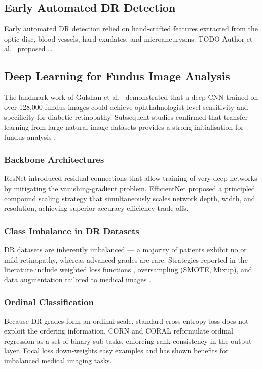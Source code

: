 \documentclass[12pt, a4paper]{article}
\begin{document}
\subsection{Early Automated DR Detection}
\label{ssec:lit_early}

Early automated DR detection relied on hand-crafted features extracted from the
optic disc, blood vessels, hard exudates, and microaneurysms.
TODO Author et al.\ \cite{TODO_early1} proposed \ldots

\subsection{Deep Learning for Fundus Image Analysis}
\label{ssec:lit_dl}

The landmark work of Gulshan et al.\ \cite{TODO_gulshan2016} demonstrated that a
deep CNN trained on over 128,000 fundus images could achieve ophthalmologist-level
sensitivity and specificity for diabetic retinopathy.
Subsequent studies confirmed that transfer learning from large natural-image
datasets provides a strong initialisation for fundus analysis
\cite{TODO_transfer_learning}.

\subsubsection{Backbone Architectures}
ResNet \cite{TODO_he2016} introduced residual connections that allow training of
very deep networks by mitigating the vanishing-gradient problem.
EfficientNet \cite{TODO_tan2019} proposed a principled compound scaling strategy
that simultaneously scales network depth, width, and resolution, achieving
superior accuracy-efficiency trade-offs.

\subsubsection{Class Imbalance in DR Datasets}
DR datasets are inherently imbalanced --- a majority of patients exhibit no or mild
retinopathy, whereas advanced grades are rare.
Strategies reported in the literature include weighted loss functions
\cite{TODO_weighted_loss}, oversampling (SMOTE, Mixup), and data augmentation
tailored to medical images \cite{TODO_augmentation}.

\subsubsection{Ordinal Classification}
Because DR grades form an ordinal scale, standard cross-entropy loss does not
exploit the ordering information.
CORN \cite{TODO_corn} and CORAL \cite{TODO_coral} reformulate ordinal regression
as a set of binary sub-tasks, enforcing rank consistency in the output layer.
Focal loss \cite{TODO_focal} down-weights easy examples and has shown benefits for
imbalanced medical imaging tasks.
\end{document}
